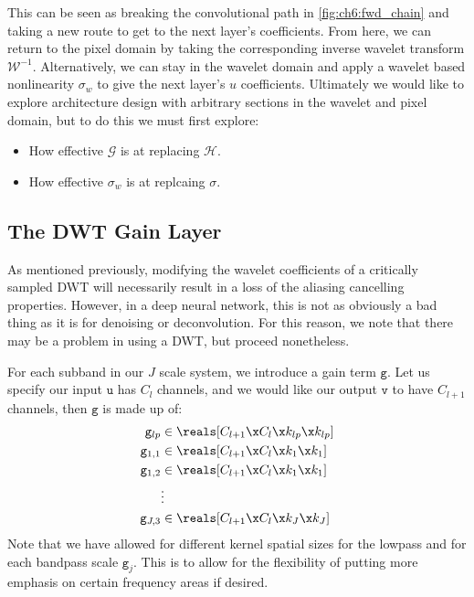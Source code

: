 This can be seen as breaking the convolutional path in
\autoref{fig:ch6:fwd_chain} and taking a new route to get to the next layer's
coefficients. From here, we can return to the pixel domain by taking the
corresponding inverse wavelet transform $\mathcal{W}^{-1}$. Alternatively, we
can stay in the wavelet domain and apply a wavelet based nonlinearity $\sigma_w$
to give the next layer's $u$ coefficients. Ultimately we would like to explore
architecture design with arbitrary sections in the wavelet and pixel domain, but
to do this we must first explore: 
\begin{itemize}
  \item How effective $\mathcal{G}$ is at replacing $\mathcal{H}$.
  \item How effective $\sigma_w$ is at replcaing $\sigma$.
\end{itemize}


\subsection{The DWT Gain Layer}
As mentioned previously, modifying the wavelet coefficients of a critically
sampled DWT will necessarily result in a loss of the aliasing cancelling
properties. However, in a deep neural network, this is not as obviously a bad
thing as it is for denoising or deconvolution. For this reason, we note that
there may be a problem in using a DWT, but proceed nonetheless.

For each subband in our $J$ scale system, we introduce a gain term $\mathtt{g}$. Let us specify our
input $\mathtt{u}$ has $C_l$ channels, and we would like our output $\mathtt{v}$
to have $C_{l+1}$ channels, then $\mathtt{g}$ is made up of:
\begin{align}
  \mathtt{g}_{lp} &\in \reals[C_{l+1}\x C_l\x k_{lp}\x k_{lp}] \label{eq:ch6:dwt_gstart} \\
  \mathtt{g}_{1,1} &\in \reals[C_{l+1}\x C_l\x k_{1}\x k_{1}] \\
  \mathtt{g}_{1,2} &\in \reals[C_{l+1}\x C_l\x k_{1}\x k_1] \\
      & \vdots  \nonumber \\
  \mathtt{g}_{J,3} &\in \reals[C_{l+1}\x C_l\x k_J\x k_J] \label{eq:ch6:dwt_gend}
\end{align}
%
Note that we have allowed for different kernel spatial sizes for the lowpass and for
each bandpass scale $\mathtt{g}_j$. This is to allow for the flexibility of
putting more emphasis on certain frequency areas if desired.

